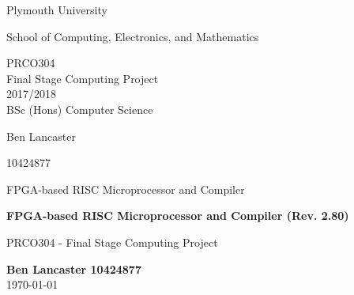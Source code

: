 \documentclass[11pt,a4paper]{report}
\newcommand{\dlatestv}{2.80}
\begin{document}

\listoftodos

\makeatletter
\DeclareRobustCommand*{\nameref}{%
\color{blue}%
        \@ifstar\T@nameref\T@nameref
        }%
\makeatother

\begin{titlepage}
\begin{center}
\vspace*{2cm}

\Huge
Plymouth University

\vspace{2cm}
\huge
School of Computing, Electronics, and Mathematics

\vspace{2cm}
\huge
PRCO304\\
Final Stage Computing Project\\
2017/2018\\

\vspace{1.5cm}
\huge
BSc (Hons) Computer Science


\Large
\vspace{1.5cm}
Ben Lancaster

\vspace{1cm}
10424877

\vspace{1cm}
FPGA-based RISC Microprocessor and Compiler




\end{center}
\end{titlepage}


\newpage
\begin{titlepage}
\begin{center}

\vspace*{5cm}
\Large

{\color{blue9d}
\textbf{
FPGA-based RISC Microprocessor and Compiler (Rev. \dlatestv{})
}
}

\vspace{0.4cm}
\large
PRCO304 - Final Stage Computing Project

\vspace{4cm}
\textbf{Ben Lancaster 10424877}\\
\today 


\end{center}

\end{titlepage}
\end{document}
